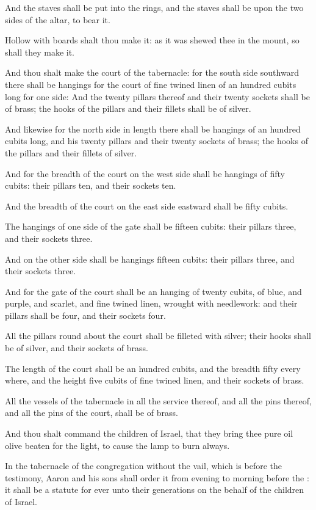 \Verse And the staves shall be put into the rings, and the staves shall be upon the two sides of the altar, to bear it.

\Verse Hollow with boards shalt thou make it: as it was shewed thee in the mount, so shall they make it.

\Verse And thou shalt make the court of the tabernacle: for the south side southward there shall be hangings for the court of fine twined linen of an hundred cubits long for one side: \Verse And the twenty pillars thereof and their twenty sockets shall be of brass; the hooks of the pillars and their fillets shall be of silver.

\Verse And likewise for the north side in length there shall be hangings of an hundred cubits long, and his twenty pillars and their twenty sockets of brass; the hooks of the pillars and their fillets of silver.

\Verse And for the breadth of the court on the west side shall be hangings of fifty cubits: their pillars ten, and their sockets ten.

\Verse And the breadth of the court on the east side eastward shall be fifty cubits.

\Verse The hangings of one side of the gate shall be fifteen cubits: their pillars three, and their sockets three.

\Verse And on the other side shall be hangings fifteen cubits: their pillars three, and their sockets three.

\Verse And for the gate of the court shall be an hanging of twenty cubits, of blue, and purple, and scarlet, and fine twined linen, wrought with needlework: and their pillars shall be four, and their sockets four.

\Verse All the pillars round about the court shall be filleted with silver; their hooks shall be of silver, and their sockets of brass.

\Verse The length of the court shall be an hundred cubits, and the breadth fifty every where, and the height five cubits of fine twined linen, and their sockets of brass.

\Verse All the vessels of the tabernacle in all the service thereof, and all the pins thereof, and all the pins of the court, shall be of brass.

\Verse And thou shalt command the children of Israel, that they bring thee pure oil olive beaten for the light, to cause the lamp to burn always.

\Verse In the tabernacle of the congregation without the vail, which is before the testimony, Aaron and his sons shall order it from evening to morning before the \LORD: it shall be a statute for ever unto their generations on the behalf of the children of Israel.

